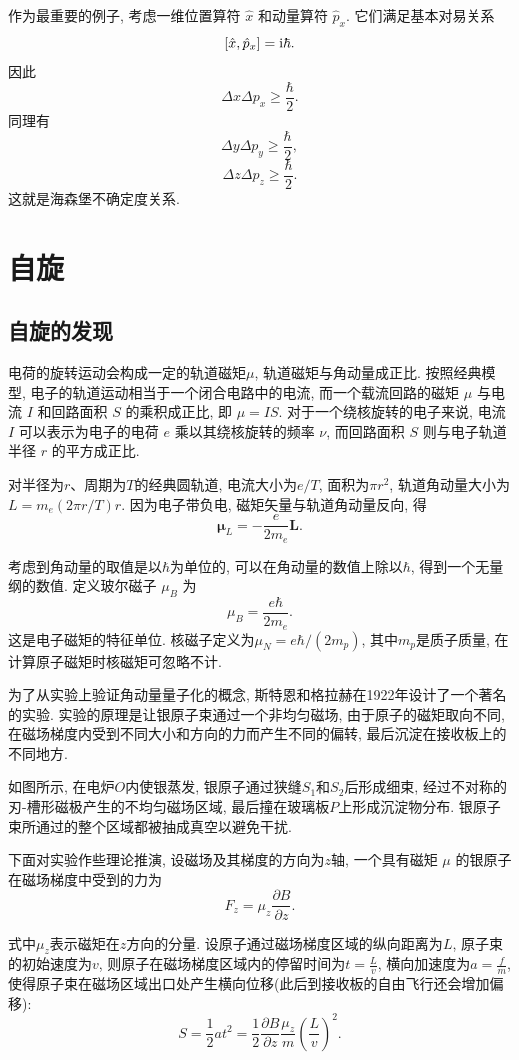 作为最重要的例子, 考虑一维位置算符 $\hat x$ 和动量算符 $\hat p_x$. 它们满足基本对易关系
\[
[\hat x, \hat p_x]=\mathop{}\!\mathrm{i}\hbar.
\]
因此
\[
\Delta x\Delta p_x
\geq
\frac{\hbar}{2}.
\]
同理有
\[
\Delta y\Delta p_y
\geq
\frac{\hbar}{2},
\]
\[
\Delta z\Delta p_z
\geq
\frac{\hbar}{2}.
\]
这就是海森堡不确定度关系.

\section{自旋}
\subsection{自旋的发现}
电荷的旋转运动会构成一定的轨道磁矩$\mu$, 轨道磁矩与角动量成正比. 按照经典模型, 电子的轨道运动相当于一个闭合电路中的电流, 而一个载流回路的磁矩 $\mu$ 与电流 $I$ 和回路面积 $S$ 的乘积成正比, 即 $\mu = I S$. 对于一个绕核旋转的电子来说, 电流 $I$ 可以表示为电子的电荷 $e$ 乘以其绕核旋转的频率 $\nu$, 而回路面积 $S$ 则与电子轨道半径 $r$ 的平方成正比.

对半径为$r$、周期为$T$的经典圆轨道, 电流大小为$e/T$, 面积为$\pi r^2$, 轨道角动量大小为$L=m_e(2\pi r/T)r$. 因为电子带负电, 磁矩矢量与轨道角动量反向, 得
\[
\bm\mu_L=-\frac{e}{2m_e}\bm L.
\]

考虑到角动量的取值是以$\hbar$为单位的, 可以在角动量的数值上除以$\hbar$, 得到一个无量纲的数值. 定义玻尔磁子 $\mu_B$ 为
\[
\mu_B = \frac{e\hbar}{2m_e}.
\]
这是电子磁矩的特征单位. 核磁子定义为$\mu_N=e\hbar/(2m_p)$, 其中$m_p$是质子质量, 在计算原子磁矩时核磁矩可忽略不计.

为了从实验上验证角动量量子化的概念, 斯特恩和格拉赫在1922年设计了一个著名的实验. 实验的原理是让银原子束通过一个非均匀磁场, 由于原子的磁矩取向不同, 在磁场梯度内受到不同大小和方向的力而产生不同的偏转, 最后沉淀在接收板上的不同地方.


如图所示, 在电炉$O$内使银蒸发, 银原子通过狭缝$S_1$和$S_2$后形成细束, 经过不对称的刃-槽形磁极产生的不均匀磁场区域, 最后撞在玻璃板$P$上形成沉淀物分布. 银原子束所通过的整个区域都被抽成真空以避免干扰.

下面对实验作些理论推演, 设磁场及其梯度的方向为$z$轴, 一个具有磁矩 $\mu$ 的银原子在磁场梯度中受到的力为
\[
F_z = \mu_z \frac{\partial B}{\partial z}.
\]

式中$\mu_z$表示磁矩在$z$方向的分量. 设原子通过磁场梯度区域的纵向距离为$L$, 原子束的初始速度为$v$, 则原子在磁场梯度区域内的停留时间为$t=\frac{L}{v}$, 横向加速度为$a=\frac{f}{m}$, 使得原子束在磁场区域出口处产生横向位移(此后到接收板的自由飞行还会增加偏移):
\[
S = \frac{1}{2} a t^2 = \frac{1}{2} \frac{\partial B}{\partial z}\frac{\mu_z}{m} \left(\frac{L}{v}\right)^2.
\]

